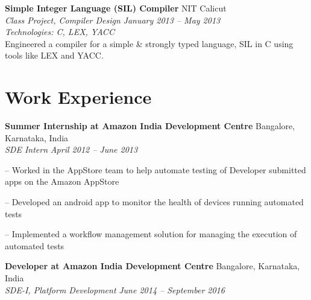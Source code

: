 \documentclass[margin,line]{resume}
\begin{document}
\begin{resume}
	\vspace{2mm}%

	\textbf{Simple Integer Language (SIL) Compiler} 						\hfill NIT Calicut
	\\
    \textit{Class Project, Compiler Design} 	\hfill \textit{January 2013 -- May 2013}
    \\
    \textit{Technologies: C, LEX, YACC}
    \\
	Engineered a compiler for a simple \& strongly typed language, SIL in C using tools like LEX and YACC.
  
  
    \vspace{2mm}
         
    \section{\mysidestyle Work Experience } 
	 \textbf{Summer Internship at Amazon India Development Centre} \hfill Bangalore, Karnataka, India
	 \\
     \textit{SDE Intern} \hfill \textit{April 2012 -- June 2013}
    
    \begin{compactitem}
        \item[--] Worked in the AppStore team to help automate testing of Developer submitted apps on the Amazon AppStore
        \item[--] Developed an android app to monitor the health of devices running automated tests
        \item[--] Implemented a workflow management solution for managing the execution of automated tests
    \end{compactitem}
    
    \vspace{2mm}
    
     \textbf{Developer at Amazon India Development Centre} \hfill Bangalore, Karnataka, India
	 \\
     \textit{SDE-I, Platform Development} \hfill \textit{June 2014 -- September 2016}


\end{resume}
\end{document}
